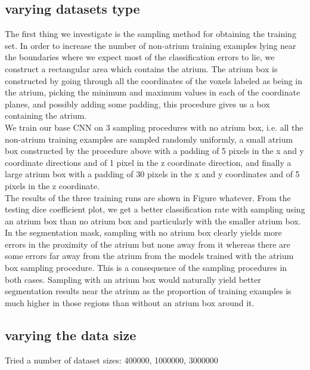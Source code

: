 \subsection{varying datasets type}

\noindent The first thing we investigate is the sampling method for obtaining the training set. In order to increase the number of non-atrium training examples lying near the boundaries where we expect most of the classification errors to lie, we construct a rectangular area which contains the atrium. The atrium box is constructed by going through all the coordinates of the voxels labeled as being in the atrium, picking the minimum and maximum values in each of the coordinate planes, and possibly adding some padding, this procedure gives us a box containing the atrium. \\

\noindent We train our base CNN on 3 sampling procedures with no atrium box, i.e. all the non-atrium training examples are sampled randomly uniformly, a small atrium box constructed by the procedure above with a padding of 5 pixels in the x and y coordinate directions and of 1 pixel in the z coordinate direction, and finally a large atrium box with a padding of 30 pixels in the x and y coordinates and of 5 pixels in the z coordinate.\\

\noindent The results of the three training runs are shown in Figure whatever. From the testing dice coefficient plot, we get a better classification rate with sampling using an atrium box than no atrium box and particularly with the smaller atrium box. In the segmentation mask, sampling with no atrium box clearly yields more errors in the proximity of the atrium but none away from it whereas there are some errors far away from the atrium from the models trained with the atrium box sampling procedure. This is a consequence of the sampling procedures in both cases. Sampling with an atrium box would naturally yield better segmentation results near the atrium as the proportion of training examples is much higher in those regions than without an atrium box around it.\\

\subsection{varying the data size}

\noindent Tried a number of dataset sizes: 400000, 1000000, 3000000






